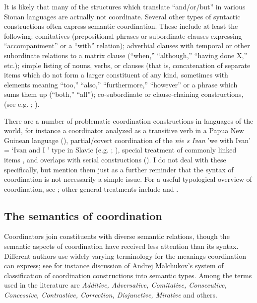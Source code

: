 \documentclass[output=paper]{LSP/langsci}
\begin{document}
It is likely that many of the structures which translate ``and/or/but'' in various Siouan languages are actually not coordinate. Several other types of syntactic constructions often express semantic coordination. These include at least the following:  comitatives (prepositional phrases or subordinate clauses expressing ``accompaniment'' or a ``with'' relation);  adverbial clauses with temporal or other subordinate relations to a matrix clause (``when,'' ``although,'' ``having done X,'' etc.);  simple listing of nouns, verbs, or clauses (that is, concatenation of separate items which do not form a larger constituent of any kind, sometimes with elements meaning ``too,'' ``also,'' ``furthermore,'' ``however'' or a phrase which sums them up (``both,'' ``all'');  co-subordinate or clause-chaining constructions, (see e.g. \citealt{Graczyk2007}; \citealt{Boyle2007}).

There are a number of problematic coordination constructions in languages of the world, for instance a coordinator analyzed as a transitive verb in a Papua New Guinean language (\citealt{BrownDryer2008}), partial/covert coordination of the \textit{nie s Ivan} 'we with Ivan' = `Ivan and I ' type in Slavic (e.g. \citealt{McNally1993}; \citealt{Larson2014}), special treatment of commonly linked items \citep{Walchli1995}, and overlaps with serial constructions (\citealt{Carstens2002}). I do not deal with these specifically, but mention them just as a further reminder that the syntax of coordination is not necessarily a simple issue. For a useful typological overview of coordination, see \citet{Haspelmath2007}; other general treatments include \citet{Johannessen1998} and  \citet{VanOirsouw1987}. 

\subsection{The semantics of coordination}

Coordinators join constituents with diverse semantic relations, though the semantic aspects of coordination have received less attention than its syntax. Different authors use widely varying terminology for the meanings coordination can express; see for instance  discussion of Andrej Malchukov's system of classification of coordination constructions into semantic types. Among the terms used in the literature are \textit{Additive, Adversative, Comitative, Consecutive, Concessive, Contrastive, Correction, Disjunctive, Mirative} and others.
\end{document}
